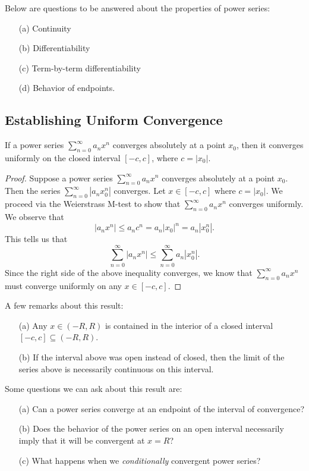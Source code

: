Below are questions to be answered about the properties of power series:
\begin{enumerate}
    \item[(a)] Continuity
    \item[(b)] Differentiability
    \item[(c)] Term-by-term differentiability
    \item[(d)] Behavior of endpoints.
\end{enumerate}
\subsection{Establishing Uniform Convergence}

\begin{theorem}
    If a power series \( \sum_{ n= 0 }^{  \infty   } a_n x^n \) converges absolutely at a point \( x_0  \), then it converges uniformly on the closed interval \( [-c , c ] \), where \( c  = | x_0  |  \).
\end{theorem}

\begin{proof}
    Suppose a power series \( \sum_{ n=0  }^{  \infty   } a_n x^n  \) converges absolutely at a point \( x_0  \). Then the series \(  \sum_{ n=0  }^{  \infty  } | a_n x_0^n |  \) converges. Let \( x \in [-c , c ] \) where \( c = | x_0  |  \). We proceed via the Weierstrass M-test to show that \( \sum_{ n=0  }^{ \infty  } a_n x^n  \) converges uniformly. We observe that 
    \[  | a_n x^n  |  \leq a_n c^n = a_n | x_0  |^n = a_n | x_0^n | .  \]
    This tells us that 
    \[  \sum_{ n=0 }^{  \infty   } | a_n x^n | \leq \sum_{ n=0  }^{ \infty  } a_n | x_0^n  |.   \]
    Since the right side of the above inequality converges, we know that \( \sum_{ n=0  }^{ \infty  } a_n x^n  \) must converge uniformly on any \( x \in [-c ,c ]  \).
\end{proof}
A few remarks about this result:
\begin{enumerate}
    \item[(a)] Any \( x \in (-R, R ) \) is contained in the interior of a closed interval \( [-c , c ]  \subseteq (-R ,R )\).
    \item[(b)] If the interval above was open instead of closed, then the limit of the series above is necessarily continuous on this interval. 
\end{enumerate}

Some questions we can ask about this result are:
\begin{enumerate}
    \item[(a)] Can a power series converge at an endpoint of the interval of convergence? 
    \item[(b)] Does the behavior of the power series on an open interval necessarily imply that it will be convergent at \( x = R  \)? 
    \item[(c)] What happens when we \textit{conditionally} convergent power series?
\end{enumerate}

